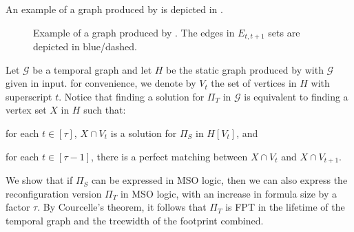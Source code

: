 \noindent An example of a graph produced by  is depicted in .

\begin{figure}[ht]
  \centering
  \caption{\label{fig:to static} Example of a graph produced by . The edges in $E_{t,t+1}$ sets are depicted in blue/dashed.}
\end{figure}


Let $\mathcal{G}$ be a temporal graph and let $H$ be the static graph produced by  with $\mathcal{G}$ given in input. for convenience, we denote by $V_t$ the set of vertices in $H$ with superscript $t$. Notice that finding a solution for $\Pi_T$ in $\mathcal{G}$ is equivalent to finding a vertex set $X$ in $H$ such that:
\begin{compactitem}
  \item for each $t \in [\tau]$, $X \cap V_t$ is a solution for $\Pi_S$ in $H[V_t]$, and
  \item for each $t \in [\tau-1]$, there is a perfect matching between $X \cap V_t$ and $X \cap V_{t+1}$.
  \end{compactitem}
We show that if $\Pi_S$ can be expressed in MSO logic, then we can also express the reconfiguration version $\Pi_T$ in MSO logic, with an increase in formula size by a factor $\tau$.
By Courcelle's theorem, it follows that $\Pi_T$ is FPT in the lifetime of the temporal graph and the treewidth of the footprint combined.


